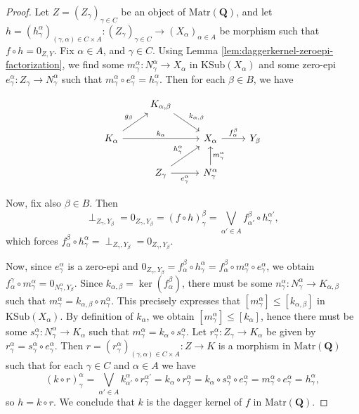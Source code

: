 \documentclass[12pt]{tac}
\theoremstyle{definition}
\theoremstyle{remark}
\newcommand{\<}{\langle}
\renewcommand{\>}{\rangle}
\renewcommand{\:}{\colon}
\begin{document}
\begin{proof}
 Let $Z=(Z_\gamma)_{\gamma\in C}$ be an object of $\mathrm{Matr}(\mathbf Q)$, and let  $h=(h_\gamma^\alpha)_{(\gamma,\alpha)\in C\times A}:(Z_\gamma)_{\gamma\in C}\to (X_\alpha)_{\alpha\in A}$ be  morphism such that $f\circ h=0_{Z,Y}$. Fix $\alpha\in A$,  and $\gamma\in C$. Using Lemma \ref{lem:daggerkernel-zeroepi-factorization}, we find some $m_\gamma^\alpha:N_\gamma^\alpha\to X_\alpha$ in $\mathrm{KSub}(X_\alpha)$ and some zero-epi $e_\gamma^\alpha:Z_\gamma\to N_\gamma^\alpha$ such that $m_\gamma^\alpha\circ e_\gamma^\alpha=h_\gamma^\alpha$.
Then for each $\beta\in B$, we have


 \[ \begin{tikzcd}
  & K_{\alpha,\beta}\ar{dr}{k_{\alpha,\beta}} &&
  \\
 K_\alpha\ar{rr}{k_\alpha}\ar{ur}{g_\beta} &&  X_\alpha\ar{r}{f_\alpha^\beta} & Y_\beta \\
 & Z_\gamma\ar{ur}{h_\gamma^\alpha}\ar{r}[swap]{e_\gamma^\alpha} & N_\gamma^\alpha\ar{u}[swap]{m_\gamma^\alpha}&
\end{tikzcd} \]

 Now, fix also $\beta\in B$. Then
 \[\perp_{Z_\gamma,Y_\beta}=0_{Z_\gamma,Y_\beta}=(f\circ h)_\gamma^\beta=\bigvee_{\alpha'\in A}f_{\alpha'}^\beta\circ h_\gamma^{\alpha'},\]
 which forces $f_\alpha^\beta\circ h_\gamma^\alpha=\perp_{Z_\gamma,Y_\beta}=0_{Z_\gamma,Y_\beta}$.
  
Now, since $e_\gamma^\alpha$ is a zero-epi and $0_{Z_\gamma,Y_\beta}=f_\alpha^\beta\circ h_\gamma^\alpha=f_\alpha^\beta\circ m_\gamma^\alpha\circ e_\gamma^\alpha$, we obtain $f_\alpha^\gamma\circ m_\gamma^\alpha=0_{N_{\gamma}^\alpha,Y_\beta}$. Since $k_{\alpha,\beta}=\ker(f_\alpha^\beta)$,  there must be some $n_\gamma^\alpha:N_\gamma^\alpha\to K_{\alpha,\beta}$ such that $m_\gamma^\alpha=k_{\alpha,\beta}\circ n_\gamma^\alpha$. This precisely expresses that $[m_\gamma^\alpha]\leq [k_{\alpha,\beta}]$ in $\mathrm{KSub}(X_\alpha)$. By definition of $k_\alpha$, we obtain $[m_\gamma^\alpha]\leq [k_\alpha]$, hence there must be some $s_\gamma^\alpha:N_\gamma^\alpha\to K_\alpha$ such that $m_\gamma^\alpha=k_\alpha\circ s_\gamma^\alpha$.
Let $r_\gamma^\alpha:Z_\gamma\to K_\alpha$ be given by $r_\gamma^\alpha=s_\gamma^\alpha\circ e_\gamma^\alpha$. Then $r=(r_\gamma^\alpha)_{(\gamma,\alpha)\in C\times A}:Z\to K$ is a morphism in $\mathrm{Matr}(\mathbf Q)$ such that for each $\gamma\in C$ and $\alpha\in A$ we have
\[ (k\circ r)_\gamma^\alpha=\bigvee_{\alpha'\in A}k_{\alpha'}^\alpha\circ r_{\gamma}^{\alpha'}=k_\alpha\circ r_\gamma^\alpha=k_\alpha\circ s_\gamma^\alpha\circ e_\gamma^\alpha=m_\gamma^\alpha\circ e_\gamma^\alpha=h_\gamma^\alpha,\]
so $h=k\circ r$. We conclude that $k$ is the dagger kernel of $f$ in $\mathrm{Matr}(\mathbf Q)$.
\end{proof}
\end{document}
